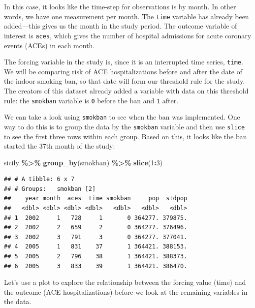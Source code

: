 \documentclass[
]{book}
\newenvironment{Shaded}{\begin{snugshade}}{\end{snugshade}}
\newcommand{\DecValTok}[1]{\textcolor[rgb]{0.00,0.00,0.81}{#1}}
\newcommand{\FunctionTok}[1]{\textcolor[rgb]{0.13,0.29,0.53}{\textbf{#1}}}
\newcommand{\NormalTok}[1]{#1}
\newcommand{\SpecialCharTok}[1]{\textcolor[rgb]{0.81,0.36,0.00}{\textbf{#1}}}
\begin{document}
In this case, it looks like the time-step for observations is by month. In other words, we have one measurement per month. The \texttt{time} variable has already been added---this gives us the month in the study period. The outcome variable of interest is \texttt{aces}, which gives the number of hospital admissions for acute coronary events (ACEs) in each month.

The forcing variable in the study is, since it is an interrupted time series, \texttt{time}. We will be comparing risk of ACE hospitalizations before and after the date of the indoor smoking ban, so that date will form our threshold rule for the study. The creators of this dataset already added a variable with data on this threshold rule: the \texttt{smokban} variable is \texttt{0} before the ban and \texttt{1} after.

We can take a look using \texttt{smokban} to see when the ban was implemented. One
way to do this is to group the data by the \texttt{smokban} variable and then use \texttt{slice} to see the first three rows within each group. Based on this, it looks like the ban started the 37th month of the study:

\begin{Shaded}
\begin{Highlighting}[]
\NormalTok{sicily }\SpecialCharTok{\%\textgreater{}\%}  
  \FunctionTok{group\_by}\NormalTok{(smokban) }\SpecialCharTok{\%\textgreater{}\%} 
  \FunctionTok{slice}\NormalTok{(}\DecValTok{1}\SpecialCharTok{:}\DecValTok{3}\NormalTok{)}
\end{Highlighting}
\end{Shaded}

\begin{verbatim}
## # A tibble: 6 x 7
## # Groups:   smokban [2]
##    year month  aces  time smokban     pop  stdpop
##   <dbl> <dbl> <dbl> <dbl>   <dbl>   <dbl>   <dbl>
## 1  2002     1   728     1       0 364277. 379875.
## 2  2002     2   659     2       0 364277. 376496.
## 3  2002     3   791     3       0 364277. 377041.
## 4  2005     1   831    37       1 364421. 388153.
## 5  2005     2   796    38       1 364421. 388373.
## 6  2005     3   833    39       1 364421. 386470.
\end{verbatim}

Let's use a plot to explore the relationship between the forcing value (time) and the outcome (ACE hospitalizations) before we look at the remaining variables in the data.
\end{document}
